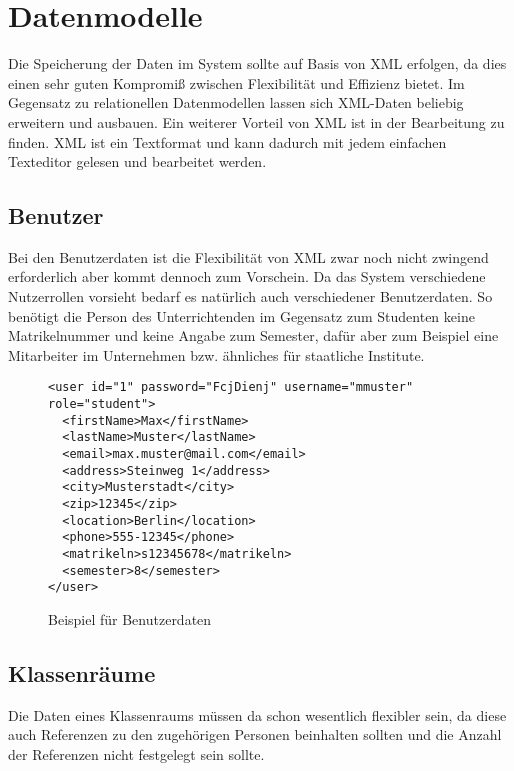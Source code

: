 \section{Datenmodelle}

Die Speicherung der Daten im System sollte auf Basis von XML erfolgen, da dies einen sehr
guten Kompromi{\ss} zwischen Flexibilit\"at und Effizienz bietet. Im Gegensatz zu relationellen
Datenmodellen lassen sich XML-Daten beliebig erweitern und ausbauen. Ein weiterer Vorteil von
XML ist in der Bearbeitung zu finden. XML ist ein Textformat und kann dadurch mit jedem einfachen 
Texteditor gelesen und bearbeitet werden.

\subsection{Benutzer}

Bei den Benutzerdaten ist die Flexibilit\"at von XML zwar noch nicht zwingend erforderlich aber
kommt dennoch zum Vorschein. Da das System verschiedene Nutzerrollen vorsieht bedarf es nat\"urlich
auch verschiedener Benutzerdaten. So ben\"otigt die Person des Unterrichtenden im Gegensatz zum 
Studenten keine Matrikelnummer und keine Angabe zum Semester, daf\"ur aber zum Beispiel eine Mitarbeiter
im Unternehmen bzw. \"ahnliches f\"ur staatliche Institute.

\begin{figure}[h]
\begin{verbatim}
<user id="1" password="FcjDienj" username="mmuster" role="student">
  <firstName>Max</firstName>
  <lastName>Muster</lastName>
  <email>max.muster@mail.com</email>
  <address>Steinweg 1</address>
  <city>Musterstadt</city>
  <zip>12345</zip>
  <location>Berlin</location>
  <phone>555-12345</phone>
  <matrikeln>s12345678</matrikeln>
  <semester>8</semester>
</user>
\end{verbatim}
\caption{Beispiel f\"ur Benutzerdaten}
\end{figure}

\subsection{Klassenr\"aume}

Die Daten eines Klassenraums m\"ussen da schon wesentlich flexibler sein, da diese auch 
Referenzen zu den zugeh\"origen Personen beinhalten sollten und die Anzahl der Referenzen
nicht festgelegt sein sollte.  

